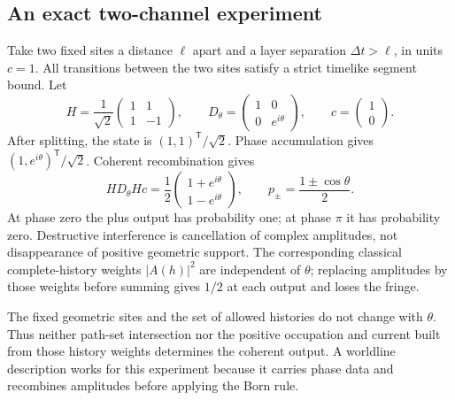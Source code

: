 \documentclass[aip,jmp,reprint,onecolumn,amsmath,amssymb]{revtex4-2}
\theoremstyle{definition}
\begin{document}
\subsection{An exact two-channel experiment}
Take two fixed sites a distance $\ell$ apart and a layer separation $\Delta t>\ell$, in units $c=1$. All transitions between the two sites satisfy a strict timelike segment bound. Let
\begin{equation}
 H=\frac1{\sqrt2}\begin{pmatrix}1&1\\1&-1\end{pmatrix},\qquad
 D_\theta=\begin{pmatrix}1&0\\0&e^{i\theta}\end{pmatrix},\qquad c=\begin{pmatrix}1\\0\end{pmatrix}.
\end{equation}
After splitting, the state is $(1,1)^\mathsf T/\sqrt2$. Phase accumulation gives $(1,e^{i\theta})^\mathsf T/\sqrt2$. Coherent recombination gives
\begin{equation}
 HD_\theta Hc=\frac12\begin{pmatrix}1+e^{i\theta}\\1-e^{i\theta}\end{pmatrix},\qquad
 p_\pm=\frac{1\pm\cos\theta}{2}.
 \label{eq:interferometer}
\end{equation}
At phase zero the plus output has probability one; at phase $\pi$ it has probability zero. Destructive interference is cancellation of complex amplitudes, not disappearance of positive geometric support. The corresponding classical complete-history weights $|A(h)|^2$ are independent of $\theta$; replacing amplitudes by those weights before summing gives $1/2$ at each output and loses the fringe.

The fixed geometric sites and the set of allowed histories do not change with $\theta$. Thus neither path-set intersection nor the positive occupation and current built from those history weights determines the coherent output. A worldline description works for this experiment because it carries phase data and recombines amplitudes before applying the Born rule.
\end{document}

